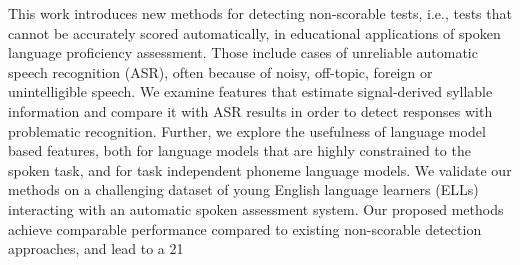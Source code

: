 This work introduces new methods for detecting non-scorable tests, i.e., tests that cannot be accurately scored automatically, in educational applications of spoken language proficiency assessment. Those include cases of unreliable automatic speech recognition (ASR), often because of noisy, off-topic, foreign or unintelligible speech. We examine features that estimate signal-derived syllable information and compare it with ASR results in order to detect responses with problematic recognition. Further, we explore the usefulness of language model based features, both for language models that are highly constrained to the spoken task, and for task independent phoneme language models. We validate our methods on a challenging dataset of young English language learners (ELLs) interacting with an automatic spoken assessment system. Our proposed methods achieve comparable performance compared to existing non-scorable detection approaches, and lead to a 21\\%
